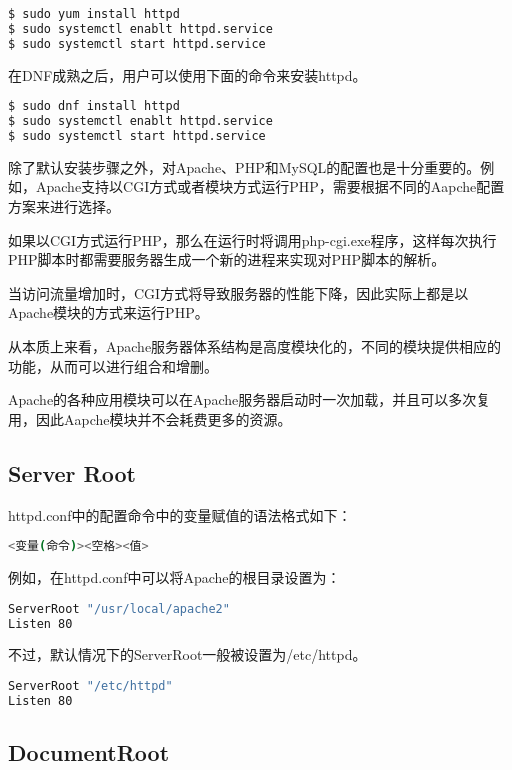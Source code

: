 \begin{lstlisting}[language=bash]
$ sudo yum install httpd
$ sudo systemctl enablt httpd.service
$ sudo systemctl start httpd.service
\end{lstlisting}


在DNF成熟之后，用户可以使用下面的命令来安装httpd。


\begin{lstlisting}[language=bash]
$ sudo dnf install httpd
$ sudo systemctl enablt httpd.service
$ sudo systemctl start httpd.service
\end{lstlisting}


除了默认安装步骤之外，对Apache、PHP和MySQL的配置也是十分重要的。例如，Apache支持以CGI方式或者模块方式运行PHP，需要根据不同的Aapche配置方案来进行选择。

如果以CGI方式运行PHP，那么在运行时将调用php-cgi.exe程序，这样每次执行PHP脚本时都需要服务器生成一个新的进程来实现对PHP脚本的解析。

当访问流量增加时，CGI方式将导致服务器的性能下降，因此实际上都是以Apache模块的方式来运行PHP。

从本质上来看，Apache服务器体系结构是高度模块化的，不同的模块提供相应的功能，从而可以进行组合和增删。

Apache的各种应用模块可以在Apache服务器启动时一次加载，并且可以多次复用，因此Aapche模块并不会耗费更多的资源。


\subsection{Server Root}

httpd.conf中的配置命令中的变量赋值的语法格式如下：

\begin{lstlisting}[language=bash]
<变量(命令)><空格><值>
\end{lstlisting}

例如，在httpd.conf中可以将Apache的根目录设置为：

\begin{lstlisting}[language=bash]
ServerRoot "/usr/local/apache2"
Listen 80
\end{lstlisting}

不过，默认情况下的ServerRoot一般被设置为/etc/httpd。

\begin{lstlisting}[language=bash]
ServerRoot "/etc/httpd"
Listen 80
\end{lstlisting}




\subsection{DocumentRoot}


